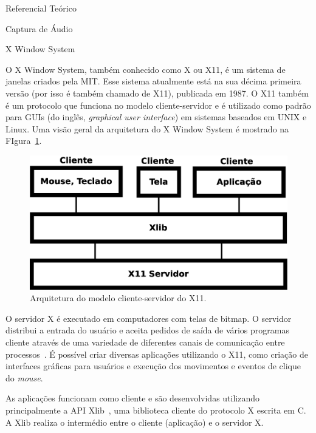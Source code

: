 \begin{chapter}{Referencial Teórico}
\begin{section}{Captura de Áudio}
\end{section}

\begin{section}{X Window System}

O X Window System, também conhecido como X ou X11, é um sistema de janelas
criados pela MIT. Esse sistema atualmente está na sua décima primeira versão
(por isso é também chamado de X11), publicada em 1987. O X11 também é um
protocolo que funciona no modelo cliente-servidor e é utilizado como padrão para
GUIs (do inglês, \textit{graphical user interface}) em sistemas baseados em UNIX
e Linux. Uma visão geral da arquitetura do X Window System é mostrado na
FIgura~\ref{fig:x11}.

\begin{figure}[!h]
	\centering
	\begin{minipage}[c]{\textwidth}
	\centering
	\includegraphics[width=0.6\linewidth]{fig/X11}
	\caption{Arquitetura do modelo cliente-servidor do X11.}
	\label{fig:x11}
	\end{minipage}
\end{figure} 

O servidor X é executado em computadores com telas de bitmap. O servidor
distribui a entrada do usuário e aceita pedidos de saída de vários programas
cliente através de uma variedade de diferentes canais de comunicação entre
processos~\cite{suse}. É possível criar diversas aplicações utilizando o X11,
como criação de interfaces gráficas para usuários e execução dos movimentos e
eventos de clique do \textit{mouse}. 

As aplicações funcionam como cliente e são desenvolvidas utilizando 
principalmente a API Xlib~\cite{xlib}, uma biblioteca cliente do protocolo X escrita
em C. A Xlib realiza o intermédio entre o cliente (aplicação) e o servidor X.  
\end{section}

\end{chapter}
